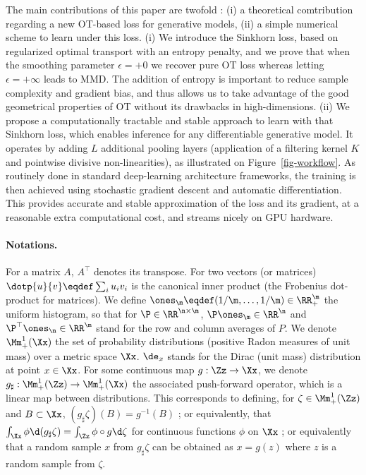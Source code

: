 The main contributions of this paper are twofold : (i) a theoretical comtribution regarding a new OT-based loss for generative models, (ii) a simple numerical scheme to learn under this loss. (i) We introduce the Sinkhorn loss, based on regularized optimal transport with an entropy penalty, and we prove that when the smoothing parameter $\epsilon=+0$ we recover pure OT loss whereas letting $\epsilon=+\infty$ leads to MMD. The addition of entropy is important to reduce sample complexity and gradient bias, and thus allows us to take advantage of the good geometrical properties of OT without its drawbacks in high-dimensions. (ii) We propose a computationally tractable and stable approach to learn with that Sinkhorn loss, which enables inference for any differentiable generative model. It operates by adding $L$ additional pooling layers (application of a filtering kernel $K$ and pointwise divisive non-linearities), as illustrated on Figure~\eqref{fig-workflow}. As routinely done in standard deep-learning architecture frameworks, the training is then achieved using stochastic gradient descent and automatic differentiation. This provides accurate and stable approximation of the loss and its gradient, at a reasonable extra computational cost, and streams nicely on GPU hardware. 

\paragraph{Notations.}

For a matrix $A$, $A^\top$ denotes its transpose. 
%
For two vectors (or matrices) $\dotp{u}{v} \eqdef \sum_i u_i v_i$ is the canonical inner product (the Frobenius dot-product for matrices).
%
We define $\ones_{\m} \eqdef (1/\m,\ldots,1/\m) \in \RR_+^{\m}$ the uniform histogram, so that for $\P \in \RR^{\n \times \m}$, $\P \ones_{\m} \in \RR^\n$ and $\P^\top \ones_{\n} \in \RR^\m$ stand for the row and column averages of $P$.
%
We denote $\Mm_+^1(\Xx)$ the set of probability distributions (positive Radon measures of unit mass) over a metric space $\Xx$. $\de_x$ stands for the Dirac (unit mass) distribution at point $x \in \Xx$.
%
For some continuous map $g : \Zz \rightarrow \Xx$, we denote $g_\sharp : \Mm_+^1(\Zz) \rightarrow \Mm_+^1(\Xx)$ the associated push-forward operator, which is a linear map between distributions. This corresponds to defining, for $\zeta \in \Mm_+^1(\Zz)$ and $B \subset \Xx$, $(g_\sharp \zeta)(B) = g^{-1}(B)$ ; or equivalently, that $\int_\Xx \phi \d(g_\sharp \zeta) = \int_\Zz \phi \circ g \d \zeta$ for continuous functions $\phi$ on $\Xx$ ; or equivalently that a random sample $x$ from $g_\sharp \zeta$ can be obtained as $x=g(z)$ where $z$ is a random sample from $\zeta$. 
